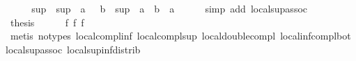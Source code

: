 \begin{isabellebody}
\ \ \isamarkupfalse%
\ \isamarkupfalse%
\ {\isachardoublequoteopen}sup\ {\isacharparenleft}{\isacharminus}\ sup\ {\isacharparenleft}{\isacharminus}\ a{\isacharparenright}\ {\isacharparenleft}{\isacharminus}\ {\isacharparenleft}{\isacharminus}\ b{\isacharparenright}{\isacharparenright}{\isacharparenright}\ {\isacharparenleft}{\isacharminus}\ sup\ {\isacharparenleft}{\isacharminus}\ a{\isacharparenright}\ {\isacharparenleft}{\isacharminus}\ b{\isacharparenright}{\isacharparenright}\ {\isacharequal}\ a{\isachardoublequoteclose}\isanewline
\ \ \ \ \isamarkupfalse%
\ {\isacharparenleft}simp\ add{\isacharcolon}\ local{\isachardot}sup{\isacharunderscore}assoc{\isacharparenright}\isanewline
\ \ \isamarkupfalse%
\ \isamarkupfalse%
\ {\isacharquery}thesis\isanewline
\ \ \ \ \isamarkupfalse%
\ f{}{}\ f{}{}\ f{}{}\ \isamarkupfalse%
\ {\isacharparenleft}metis\ {\isacharparenleft}no{\isacharunderscore}types{\isacharparenright}\ local{\isachardot}compl{\isacharunderscore}inf\ local{\isachardot}compl{\isacharunderscore}sup\ local{\isachardot}double{\isacharunderscore}compl\ local{\isachardot}inf{\isacharunderscore}compl{\isacharunderscore}bot\ local{\isachardot}sup{\isacharunderscore}assoc\ local{\isachardot}sup{\isacharunderscore}inf{\isacharunderscore}distrib{}{\isacharparenright}\isanewline
{}\isamarkupfalse%
%
\endisatagproof
{\isafoldproof}%
%
\isadelimproof
\isanewline
%
\endisadelimproof
\isanewline
{}\isamarkupfalse%
\isanewline
%
\isadelimtheory
\isanewline
%
\endisadelimtheory
%
\isatagtheory
{}\isamarkupfalse%
%
\endisatagtheory
{\isafoldtheory}%
%
\isadelimtheory
\isanewline
%
\endisadelimtheory
%
\end{isabellebody}%
